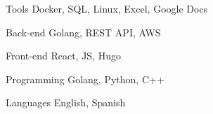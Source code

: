 

\begin{cvskills}

  \cvskill
    {Tools} %
    {Docker, SQL, Linux, Excel, Google Docs} %

  \cvskill
    {Back-end} %
    {Golang, REST API, AWS} %

  \cvskill
    {Front-end} %
    {React, JS, Hugo} %

  \cvskill
    {Programming} %
    {Golang, Python, C++} %

  \cvskill
    {Languages} %
    {English, Spanish} %

\end{cvskills}

